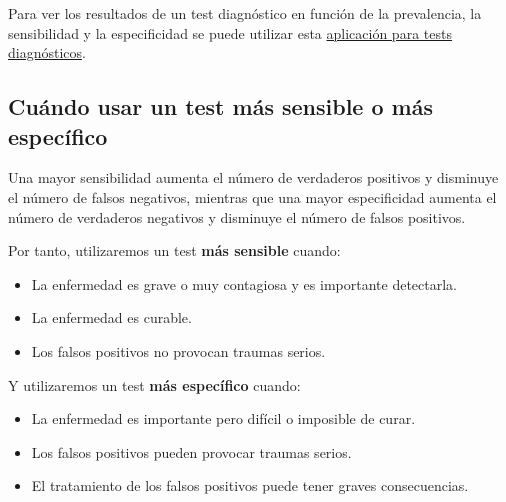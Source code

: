 \documentclass[
  spanish,
  a4paper,
]{scrreport}
\providecommand{\tightlist}{%
  \setlength{\itemsep}{0pt}\setlength{\parskip}{0pt}}
\theoremstyle{definition}
\theoremstyle{definition}
\theoremstyle{remark}
\begin{document}
\begin{tcolorbox}[enhanced jigsaw, arc=.35mm, bottomrule=.15mm, bottomtitle=1mm, breakable, colback=white, colbacktitle=quarto-callout-tip-color!10!white, colframe=quarto-callout-tip-color-frame, coltitle=black, left=2mm, leftrule=.75mm, opacityback=0, opacitybacktitle=0.6, rightrule=.15mm, title=\textcolor{quarto-callout-tip-color}{\faLightbulb}\hspace{0.5em}{Aplicación interactiva}, titlerule=0mm, toprule=.15mm, toptitle=1mm]

Para ver los resultados de un test diagnóstico en función de la
prevalencia, la sensibilidad y la especificidad se puede utilizar esta
\href{http://nube.aprendeconalf.es/shiny/diagnostic-test/}{aplicación
para tests diagnósticos}.

\end{tcolorbox}

\subsection{Cuándo usar un test más sensible o más
específico}\label{cuuxe1ndo-usar-un-test-muxe1s-sensible-o-muxe1s-especuxedfico}

Una mayor sensibilidad aumenta el número de verdaderos positivos y
disminuye el número de falsos negativos, mientras que una mayor
especificidad aumenta el número de verdaderos negativos y disminuye el
número de falsos positivos.

Por tanto, utilizaremos un test \textbf{más sensible} cuando:

\begin{itemize}
\tightlist
\item
  La enfermedad es grave o muy contagiosa y es importante detectarla.
\item
  La enfermedad es curable.
\item
  Los falsos positivos no provocan traumas serios.
\end{itemize}

Y utilizaremos un test \textbf{más específico} cuando:

\begin{itemize}
\tightlist
\item
  La enfermedad es importante pero difícil o imposible de curar.
\item
  Los falsos positivos pueden provocar traumas serios.
\item
  El tratamiento de los falsos positivos puede tener graves
  consecuencias.
\end{itemize}
\end{document}

